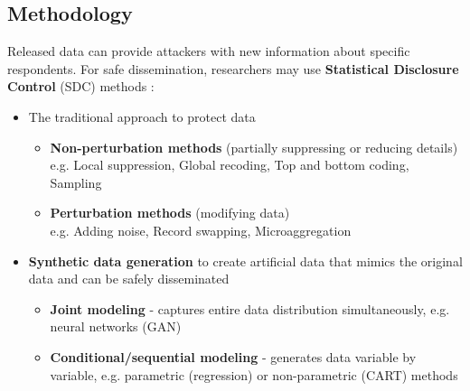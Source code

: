 \documentclass[a0,portrait]{a0poster}
\begin{document}
\begin{multicols}{3}
\section{Methodology}



Released data can provide attackers with new information about specific respondents. For safe dissemination, researchers may use \textbf{Statistical Disclosure Control} (SDC) methods \cite{2017_Templ}:

\begin{itemize}
    \item[\ding{228}] The traditional approach to protect data
        \begin{itemize}
            \item[\textbullet] \textbf{Non-perturbation methods} (partially suppressing or reducing details) e.g. Local suppression, %
            Global recoding, %
            Top and bottom coding, Sampling  
            \item[\textbullet] \textbf{Perturbation methods} (modifying data) \\ %
            e.g. Adding noise, Record swapping,  Microaggregation
        \end{itemize}   
\end{itemize}

\begin{itemize}
     \item[\ding{228}] \textbf{Synthetic data generation} to create artificial data that mimics the original data and can be safely disseminated
        \begin{itemize}
            \item[\textbullet] \textbf{Joint modeling}  - captures entire data distribution simultaneously, e.g. neural networks (GAN)
            \item[\textbullet] \textbf{Conditional/sequential modeling} - generates data variable by variable, e.g. parametric (regression) or non-parametric (CART) methods
        \end{itemize}        
\end{itemize}


\end{multicols}
\end{document}
